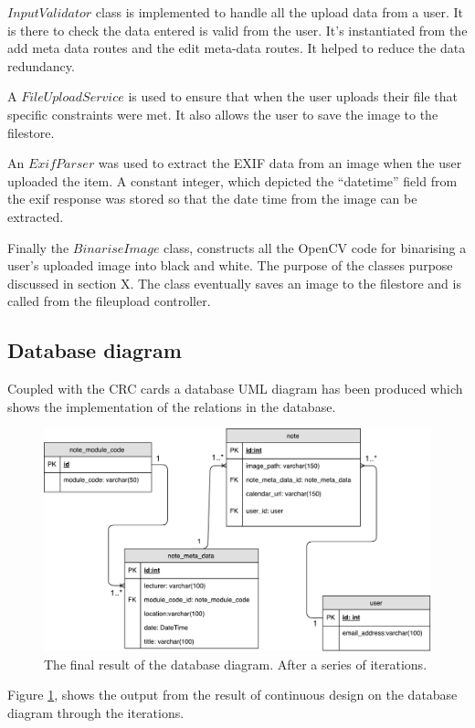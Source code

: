 $InputValidator$ class is implemented to handle all the upload data from a user. It is there to check the data entered is valid from the user. It's instantiated from the add meta data routes and the edit meta-data routes. It helped to reduce the data redundancy.

A $FileUploadService$ is used to ensure that when the user uploads their file that specific constraints were met. It also allows the user to save the image to the filestore.

An $ExifParser$ was used to extract the EXIF data from an image when the user uploaded the item. A constant integer, which depicted the ``datetime'' field from the exif response was stored so that the date time from the image can be extracted.

Finally the $BinariseImage$ class, constructs all the OpenCV code for binarising a user's uploaded image into black and white. The purpose of the classes purpose discussed in section X. The class eventually saves an image to the filestore and is called from the fileupload controller.


\subsection{Database diagram}
Coupled with the CRC cards a database UML diagram has been produced which shows the implementation of the relations in the database.

\begin{figure}[h]
  \centering
  \includegraphics[scale=0.5]{images/database_diagram}
  \caption{The final result of the database diagram. After a series of iterations.}
  \label{fig:database}
\end{figure}

Figure \ref{fig:database}, shows the output from the result of continuous design on the database diagram through the iterations.

